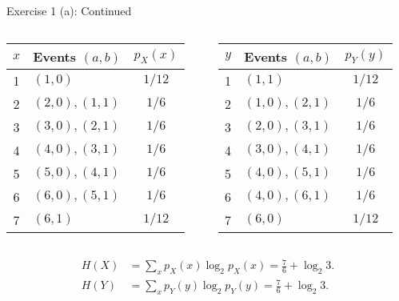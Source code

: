 \documentclass[aspectratio=169]{beamer}
\newcommand{\etpx}{H(X)}
\newcommand{\etpy}{H(Y)}
\begin{document}
\begin{frame}{Exercise 1 (a): Continued}
	\begin{columns}
		\begin{column}{0.5\textwidth}
			\begin{table}
				\begin{tabular}{c l c}
					\hline
					$x$ & Events $(a,b)$ & $p_X(x)$ \\
					\hline
					1 & $(1, 0)$	 & $1/12$ \\
					2 & $(2, 0), (1, 1)$	 & $1/6$ \\
					3 & $(3, 0), (2, 1)$	 & $1/6$ \\
					4 & $(4, 0), (3, 1)$	 & $1/6$ \\
					5 & $(5, 0), (4, 1)$	 & $1/6$ \\
					6 & $(6, 0), (5, 1)$	 & $1/6$ \\
					7 & $(6, 1)$	 & $1/12$ \\
					\hline
				\end{tabular}
			\end{table}
		\end{column}
		
		\begin{column}{0.5\textwidth}
			\begin{table}
				\begin{tabular}{c l c}
					\hline
					$y$ & Events $(a,b)$ & $p_Y(y)$ \\
					\hline
					1 & $(1, 1)$	 & $1/12$ \\
					2 & $(1, 0), (2, 1)$	 & $1/6$ \\
					3 & $(2, 0), (3, 1)$	 & $1/6$ \\
					4 & $(3, 0), (4, 1)$	 & $1/6$ \\
					5 & $(4, 0), (5, 1)$	 & $1/6$ \\
					6 & $(4, 0), (6, 1)$	 & $1/6$ \\
					7 & $(6, 0)$	 & $1/12$ \\
					\hline
				\end{tabular}
			\end{table}
		\end{column}
	\end{columns}
	
	\begin{align*}
		\etpx &= \sum_x p_X(x) \log_2 p_X(x) = \frac{7}{6} + \log_2 3. \\
		\etpy &= \sum_x p_Y(y) \log_2 p_Y(y) = \frac{7}{6} + \log_2 3. 
	\end{align*}

\end{frame}
\end{document}
